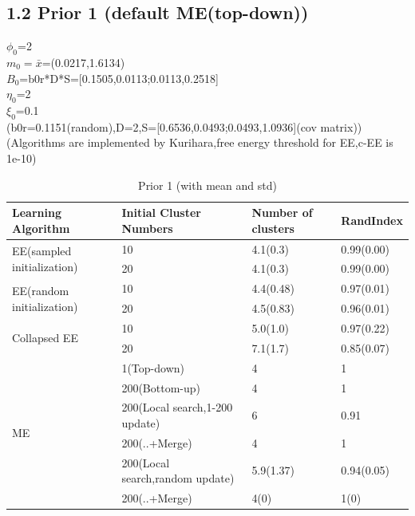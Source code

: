 \documentclass{article}
\begin{document}
\begin{spacing}{1.1}
\subsection{1.2 Prior 1 (default ME(top-down))}
$\phi_{0}$=2\\
$m_{0}=\bar{x}$=(0.0217,1.6134)\\
$B_{0}$=b0r*D*S=[0.1505,0.0113;0.0113,0.2518] \\
$\eta_{0}$=2\\
$\xi_{0}$=0.1\\
(b0r=0.1151(random),D=2,S=[0.6536,0.0493;0.0493,1.0936](cov matrix))\\
(Algorithms are implemented by Kurihara,free energy threshold for EE,c-EE is 1e-10)
\begin{table}[t]
\caption{Prior 1 (with mean and std)}
\begin{center}
\begin{tabular}{|l|l|l|l|}

\hline
{\bf Learning Algorithm} &{\bf Initial Cluster Numbers} &{\bf Number of clusters}  &{\bf RandIndex} \\ 
\hline 
\multirow{2}{*}{EE(sampled initialization)} & 10 & 4.1(0.3) & 0.99(0.00) \\
					    & 20 & 4.1(0.3) & 0.99(0.00)\\
\hline
\multirow{2}{*}{EE(random initialization)}  & 10 & 4.4(0.48)&  0.97(0.01) \\
					    & 20 & 4.5(0.83)&  0.96(0.01) \\
\hline
\multirow{2}{*}{Collapsed EE}               & 10 & 5.0(1.0)&  0.97(0.22) \\
					    & 20 & 7.1(1.7)&  0.85(0.07) \\
\hline
\multirow{6}{*}{ME}                         & 1(Top-down) &    4  &  1 \\
					    & 200(Bottom-up) & 4  &  1 \\
					    & 200(Local search,1-200 update) & 6 &  0.91  \\
					    & 200(..+Merge) & 4   &  1 \\
					    & 200(Local search,random update) & 5.9(1.37)&  0.94(0.05) \\
					    & 200(..+Merge) & 4(0)&  1(0) \\
\hline
\end{tabular}
\end{center}
\end{table}



\end{spacing}
\end{document}
